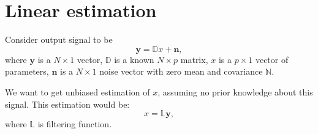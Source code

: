 \section{Linear estimation\cite{S.N1993}}\label{filtering}
Consider output signal to be
\begin{equation}
  \mathbf{y} = \mathbb{D} x + \mathbf{n},
\end{equation}
where $\mathbf{y}$ is a $N\times1$ vector, $\mathbb{D}$ is a known $N\times p$ matrix, $x$ is a $p\times 1$ vector of parameters, $\mathbf{n}$ is a 
$N\times1$ noise vector with zero mean and covariance $\mathbb{N}$.

We want to get unbiased estimation of $x$, assuming no prior knowledge about this signal. This estimation would be:
\begin{equation}
 x = \mathbb{L}\mathbf{y},
\end{equation}
where $\mathbb{L}$ is filtering function.

